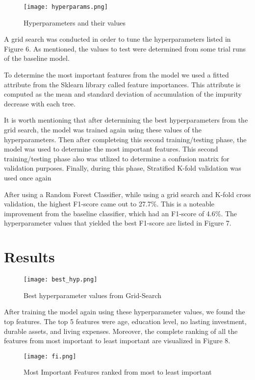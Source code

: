 \documentclass[conference]{IEEEtran}
\begin{document}
\begin{figure}[hbt!]
\centering
\texttt{[image: hyperparams.png]}
\caption{Hyperparameters and their values
\label{overflow}}
\end{figure}
A grid search was conducted in order to tune the hyperparameters listed in Figure 6. As mentioned, the values to test were determined from some trial runs of the baseline model.

To determine the most important features from the model we used a fitted attribute from the Sklearn library called feature importances. This attribute is computed as the mean and standard deviation of accumulation of the impurity decrease with each tree. 

It is worth mentioning that after determining the best hyperparameters from the grid search, the model was trained again using these values of the hyperparameters. Then after completeing this second training/testing phase, the model was used to determine the most important features. This second training/testing phase also was utlized to determine a confusion matrix for validation purposes. Finally, during this phase, Stratified K-fold validation was used once again




After using a Random Forest Classifier, while using a grid search and K-fold cross validation, the highest F1-score came out to 27.7\%. This is a noteable improvement from the baseline classifier, which had an F1-score of 4.6\%. 
The hyperparameter values that yielded the best F1-score are listed in Figure 7.
\section{Results}
\begin{figure}[hbt!]
\centering
\texttt{[image: best\_hyp.png]}
\caption{Best hyperparameter values from Grid-Search \label{overflow}}
\end{figure}


After training the model again using these hyperparameter values, we found the top features. The top 5 features were age, education level, no lasting investment, durable assets, and living expenses. Moreover, the complete ranking of all the features from most important to least important are visualized in Figure 8. 
\begin{figure}[hbt!]
\centering
\texttt{[image: fi.png]}
\caption{Most Important Features ranked from most to least important\label{overflow}}
\end{figure}
\end{document}
